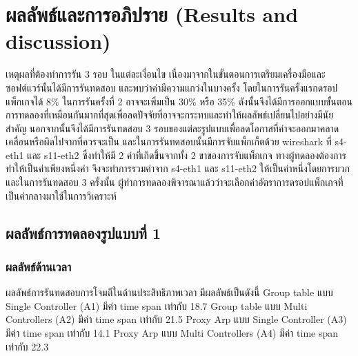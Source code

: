\section{ผลลัพธ์และการอภิปราย (Results and discussion)}
\indent\indent
เหตุผลที่ต้องทำการรัน 3 รอบ ในแต่ละเงื่อนไข เนื่องมาจากในขั้นตอนการเตรียมเครื่องมือและซอฟต์แวร์นั้นได้มีการรันทดสอบ และพบว่าค่ามีความแกว่งในบางครั้ง โดยในการรันครั้งแรกดรอปแพ็กเกจได้ 8\% ในการรันครั้งที่ 2 อาจจะเพิ่มเป็น 30\% หรือ 35\% 
ดังนั้นจึงได้มีการออกแบบขั้นตอนการทดลองที่เหมือนกันมากที่สุดเพื่อลดปัจจัยที่อาจจะกระทบและทำให้ผลลัพธ์เปลี่ยนไปอย่างมีนัยสำคัญ นอกจากนั้นจึงได้มีการรันทดสอบ 3 รอบของแต่ละรูปแบบเพื่อลดโอกาสที่ค่าจะออกมาคลาดเคลื่อนหรือผิดไปจากที่ควรจะเป็น 
และในการรันทดสอบนั้นมีการจับแพ็กเก็ตด้วย wireshark ที่ s4-eth1 และ s11-eth2 ซึ่งทำให้มี 2 ค่าที่เกิดขึ้นจากทั้ง 2 ขาของการจับแพ็กเกจ ทางผู้ทดลองต้องการทำให้เป็นค่าเพียงหนึ่งค่า
จึงจะทำการรวมค่าจาก s4-eth1 และ s11-eth2 ให้เป็นค่าหนึ่งโดยการบวก และในการรันทดสอบ 3 ครั้งนั้น 
ผู้ทำการทดลองพิจารณาแล้วว่าจะเลือกค่าอัตราการดรอปแพ็กเกจที่เป็นค่ากลางมาใช้ในการวิเคราะห์
\\
\subsection{ผลลัพธ์การทดลองรูปแบบที่ 1}
\subsubsection*{ผลลัพธ์ด้านเวลา}

ผลลัพธ์การรันทดสอบการโจมตีในด้านประสิทธิภาพเวลา มีผลลัพธ์เป็นดังนี้ 
Group table แบบ Single Controller (A1) มีค่า time span เท่ากับ 18.7
Group table แบบ Multi Controllers (A2) มีค่า time span เท่ากับ 21.5
Proxy Arp แบบ Single Controller (A3) มีค่า time span เท่ากับ 14.1
Proxy Arp แบบ Multi Controllers (A4) มีค่า time span เท่ากับ 22.3

